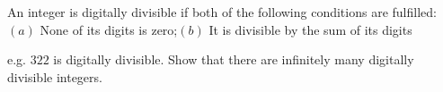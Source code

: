 An integer is digitally divisible if both of the following conditions are fulfilled:$(a)$ None of its digits is zero;$(b)$ It is divisible by the sum of its digits

e.g. $322$ is digitally divisible. Show that there are infinitely many digitally divisible integers.
